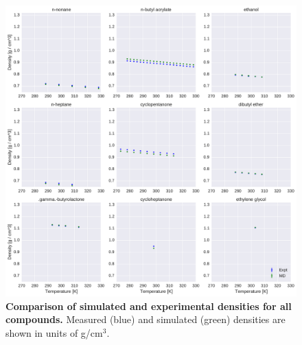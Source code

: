 \documentclass[journal=jacsat,manuscript=article]{achemso}
\begin{document}
\begin{figure}[alldensity]

\ContinuedFloat

\includegraphics[width=\textwidth]{./figures/densities_versus_temperature_part4.pdf}

\caption{{\bf Comparison of simulated and experimental densities for all compounds.} 
Measured (blue) and simulated (green) densities are shown in units of g/cm$^{3}$.
\label{figure:AllDensities}
}

\end{figure}



\end{document}
